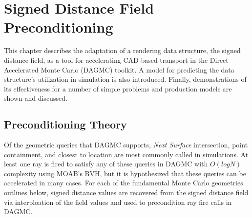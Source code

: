 

\newcommand{\precondQuery}[4] {
  \null %
  \subsection{#1}\label{subsec:#1}
  \begin{adjustwidth}{1em}{0pt}
    \begin{figure}[h]
      \begin{center}
        {width=0.65\textwidth}
        \caption{#3}
        \label{fig:#2}
      \end{center}
    \end{figure}
    #4
  \end{adjustwidth}
}

\newcommand{\sdfModel}[2] {
  \null %
  \textbf{\uppercase{#1}} 
  \begin{adjustwidth}{2.5em}{0pt}
    #2
  \end{adjustwidth}
  \null
}

\chapter{Signed Distance Field Preconditioning}\label{ch:preconditioning}

This chapter describes the adaptation of a rendering data structure, the signed
distance field, as a tool for accelerating CAD-based transport in the Direct
Accelerated Monte Carlo (DAGMC) toolkit. A model for predicting the data
structure's utilization in simulation is also introduced. Finally,
demonstrations of its effectiveness for a number of simple problems and
production models are shown and discussed.

\section{Preconditioning Theory}\label{sec:preconditioner_theory}

Of the geometric queries that DAGMC supports, \textit{Next Surface}
intersection, point containment, and closest to location are most commonly
called in simulations.  At least one ray is fired to satisfy any of these
queries in DAGMC with $O(logN)$ complexity using MOAB's BVH, but it is
hypothesized that these queries can be accelerated in many cases. For each of
the fundamental Monte Carlo geometries outlines below, signed distance values
are recovered from the signed distance field via interploation of the field
values and used to precondition ray fire calls in DAGMC.


